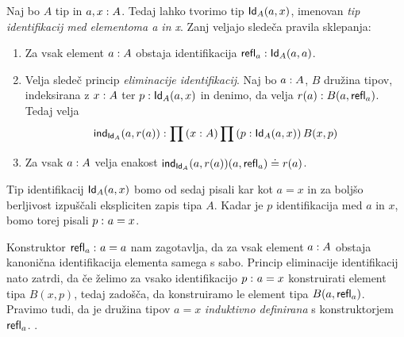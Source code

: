 \begin{definicija}
  Naj bo \(A\) tip in \(a, x : A\). Tedaj lahko tvorimo tip
  \(\textnormal{\textsf{Id}}_{A}(a, x)\),
  imenovan \emph{tip identifikacij med elementoma a in x}. Zanj veljajo sledeča pravila
  sklepanja:
  \begin{enumerate}
  \item Za vsak element \(a : A\) obstaja identifikacija
    \(\textnormal{\textsf{refl}}_{a} : \textnormal{\textsf{Id}}_{A}(a, a)\).
  \item Velja sledeč princip \emph{eliminacije identifikacij}.
    Naj bo \(a : A\), \(B\) družina tipov, indeksirana z
    \(x : A\) ter \(p : \textnormal{\textsf{Id}}_{A}(a, x)\) in denimo, da velja
    \(r(a) : B(a, \textnormal{\textsf{refl}}_{a})\). Tedaj velja
    \[\textnormal{\textsf{ind}}_{\textnormal{\textsf{Id}}_{A}}(a, r(a)) : \prod \left( x : A \right) \prod \left( p : \textnormal{\textsf{Id}}_{A}(a, x) \right) B(x, p)\]
  \item Za vsak \(a : A\) velja enakost
    \(\textnormal{\textsf{ind}}_{\textnormal{\textsf{Id}}_{A}}(a, r(a))(a, \textnormal{\textsf{refl}}_{a}) \doteq r(a)\).
  \end{enumerate}
  Tip identifikacij \(\textnormal{\textsf{Id}}_{A}(a, x)\) bomo od sedaj pisali kar kot \(a = x\) in za boljšo
  berljivost izpuščali ekspliciten zapis tipa \(A\). Kadar je \(p\) identifikacija
  med \(a\) in \(x\), bomo torej pisali \(p \,\colon a = x\).

  Konstruktor \(\textnormal{\textsf{refl}}_{a} \,\colon a = a\)
  nam zagotavlja, da za vsak element \(a : A\) obstaja kanonična
  identifikacija elementa samega s sabo. Princip eliminacije identifikacij nato zatrdi,
  da če želimo za vsako identifikacijo \(p \,\colon a = x\) konstruirati element tipa
  \(B(x, p)\), tedaj zadošča, da konstruiramo le element tipa \(B(a, \textnormal{\textsf{refl}}_{a})\).
  Pravimo tudi, da je družina tipov \(a = x\) \emph{induktivno definirana} s
  konstruktorjem \(\textnormal{\textsf{refl}}_{a}\).
.\end{definicija}

